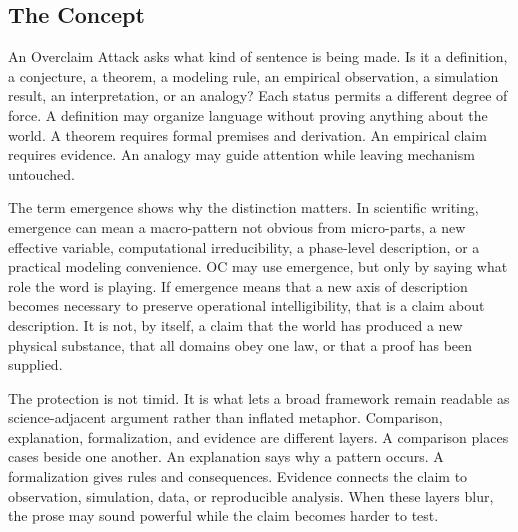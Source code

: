 \documentclass[11pt,a4paper,openany]{book}
\begin{document}
\subsection{The Concept}
An Overclaim Attack asks what kind of sentence is being made. Is it a definition, a conjecture, a theorem, a modeling rule, an empirical observation, a simulation result, an interpretation, or an analogy? Each status permits a different degree of force. A definition may organize language without proving anything about the world. A theorem requires formal premises and derivation. An empirical claim requires evidence. An analogy may guide attention while leaving mechanism untouched. \cite{grimmett_percolation,goldenfeld_lectures}\par
The term emergence shows why the distinction matters. In scientific writing, emergence can mean a macro-pattern not obvious from micro-parts, a new effective variable, computational irreducibility, a phase-level description, or a practical modeling convenience. OC may use emergence, but only by saying what role the word is playing. If emergence means that a new axis of description becomes necessary to preserve operational intelligibility, that is a claim about description. It is not, by itself, a claim that the world has produced a new physical substance, that all domains obey one law, or that a proof has been supplied.\par
The protection is not timid. It is what lets a broad framework remain readable as science-adjacent argument rather than inflated metaphor. Comparison, explanation, formalization, and evidence are different layers. A comparison places cases beside one another. An explanation says why a pattern occurs. A formalization gives rules and consequences. Evidence connects the claim to observation, simulation, data, or reproducible analysis. When these layers blur, the prose may sound powerful while the claim becomes harder to test.\par
\end{document}
